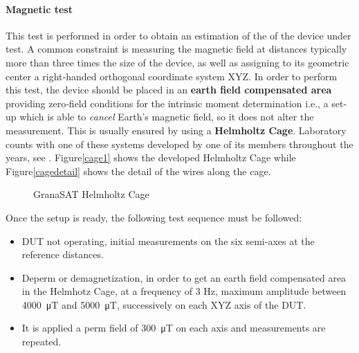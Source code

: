 \paragraph{Magnetic test} \label{magnetotest}

This test is performed in order to obtain an estimation of the  of the device under test. A common constraint is measuring the magnetic field at distances typically more than three times the size of the device, as well as assigning to its geometric center a right‐handed orthogonal coordinate system XYZ. In order to perform this test, the device should be placed in an \textbf{earth field compensated area} providing zero‐field conditions for the intrinsic moment determination i.e., a set-up which is able to \textit{cancel} Earth's magnetic field, so it does not alter the measurement. This is usually ensured by using a \textbf{Helmholtz Cage}.  Laboratory counts with one of these systems developed by one of its members throughout the years, see \cite{ramsel}. Figure\autoref{cage1} shows the developed Helmholtz Cage while Figure\autoref{cagedetail} shows the detail of the wires along the cage.

			\begin{figure}[H]
			\centering
			 \quad
			\caption{GranaSAT Helmholtz Cage}
			\vspace{-0.5cm}
\end{figure}

Once the setup is ready, the following test sequence must be followed:

\begin{itemize}  [noitemsep,topsep=0pt]
	
	\item{\acrshort{DUT} not operating, initial measurements on the six semi‐axes at the reference distances.} \\
	 \item Deperm or demagnetization, in order to get an earth field compensated area in the Helmhotz Cage, at a frequency of 3 Hz, maximum amplitude between \SI{4000}{ \micro\tesla} and \SI{5000}{ \micro\tesla}, successively on each XYZ axis of the \acrshort{DUT}. \\
	\item{It is applied a perm field of \SI{300}{ \micro\tesla} on each axis and measurements are repeated.}

\end{itemize}

